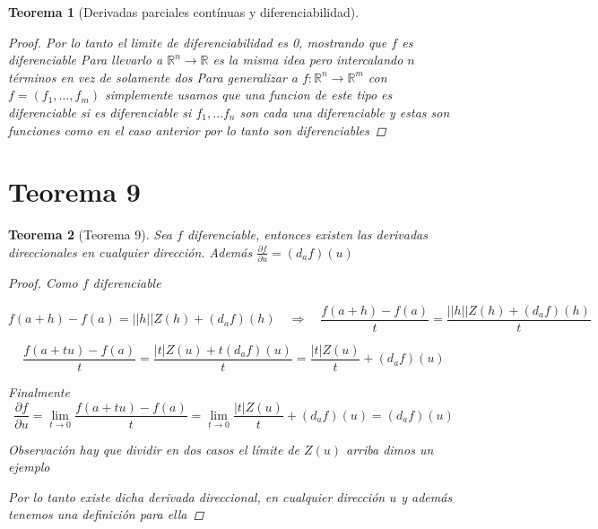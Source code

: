 \documentclass{article}
\theoremstyle{break}
\newtheorem{theorem}{Teorema}[section]
\begin{document}
\begin{theorem}[Derivadas parciales contínuas y diferenciabilidad]
\begin{proof}
      Por lo tanto el limite de diferenciabilidad es 0, mostrando que $f$ es diferenciable
      Para llevarlo a $\mathbb{R}^{n} \longrightarrow \mathbb{R}$ es la misma idea pero intercalando $n$
      términos en vez de solamente dos
      Para generalizar a $f:\mathbb{R}^{n} \longrightarrow  \mathbb{R}^{m} $ con $f = (f_1,\ldots,f_m)$ 
      simplemente usamos que una funcion de este tipo es diferenciable si es diferenciable si $f_1,\ldots f_n$ 
      son cada una diferenciable y estas son funciones como en el caso anterior por lo tanto son diferenciables
  \end{proof}
\end{theorem}


\section{Teorema 9}
\begin{theorem}[Teorema 9]
  Sea $f$ diferenciable, entonces existen las derivadas direccionales en cualquier dirección. Además 
  $\frac{\partial f}{\partial u} = (d_af)(u)$
  \begin{proof}
    Como $f$ diferenciable 

    $$f(a+h) - f(a) = ||h||Z(h) + (d_af)(h) \quad \Longrightarrow \quad \frac{f(a+h) - f(a)}{t} = \frac{||h||Z(h)+(d_af)(h)}{t}$$

    $$\frac{f(a+ tu) - f(a)}{t} = \frac{|t|Z(u) + t(d_af)(u)}{t} = \frac{|t|Z(u)}{t} + (d_af)(u)$$

    Finalmente $$\frac{\partial f}{\partial u} = \lim_{t \rightarrow 0 }\frac{f(a+ tu) - f(a)}{t} =\lim_{t \rightarrow 0 }
    \frac{|t|Z(u)}{t} + (d_af)(u) = (d_af)(u) $$

    Observación hay que dividir en dos casos el límite de $Z(u)$ arriba dimos un ejemplo

    Por lo tanto existe dicha derivada direccional, en cualquier dirección $u$ y además tenemos una definición para ella
  \end{proof}
\end{theorem}
\end{document}
